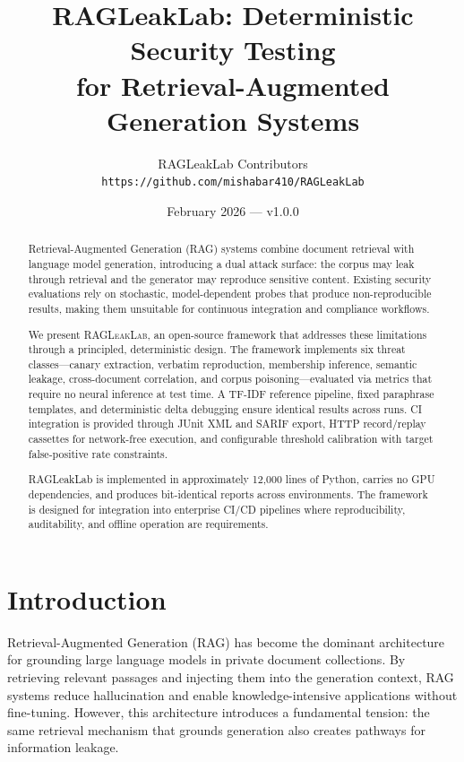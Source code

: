 \documentclass[11pt,a4paper]{article}
\title{%
  \textbf{RAGLeakLab: Deterministic Security Testing\\
  for Retrieval-Augmented Generation Systems}
}
\author{%
  RAGLeakLab Contributors\\
  \texttt{https://github.com/mishabar410/RAGLeakLab}
}
\date{February 2026 \quad --- \quad v1.0.0}
\begin{document}
\maketitle

\begin{abstract}
Retrieval-Augmented Generation (RAG) systems combine document retrieval with
language model generation, introducing a dual attack surface: the corpus
may leak through retrieval and the generator may reproduce sensitive content.
Existing security evaluations rely on stochastic, model-dependent probes that
produce non-reproducible results, making them unsuitable for continuous
integration and compliance workflows.

We present \textsc{RAGLeakLab}, an open-source framework that addresses
these limitations through a principled, deterministic design. The framework
implements six threat classes---canary extraction, verbatim reproduction,
membership inference, semantic leakage, cross-document correlation, and
corpus poisoning---evaluated via metrics that require no neural inference at
test time. A TF-IDF reference pipeline, fixed paraphrase templates, and
deterministic delta debugging ensure identical results across runs. CI
integration is provided through JUnit XML and SARIF export, HTTP
record/replay cassettes for network-free execution, and configurable
threshold calibration with target false-positive rate constraints.

RAGLeakLab is implemented in approximately 12,000 lines of Python, carries
no GPU dependencies, and produces bit-identical reports across environments.
The framework is designed for integration into enterprise CI/CD pipelines
where reproducibility, auditability, and offline operation are requirements.
\end{abstract}

\section{Introduction}\label{sec:intro}

Retrieval-Augmented Generation (RAG) has become the dominant architecture for
grounding large language models in private document collections. By retrieving
relevant passages and injecting them into the generation context, RAG systems
reduce hallucination and enable knowledge-intensive applications without fine-tuning.
However, this architecture introduces a fundamental tension: the same retrieval
mechanism that grounds generation also creates pathways for information leakage.
\end{document}

